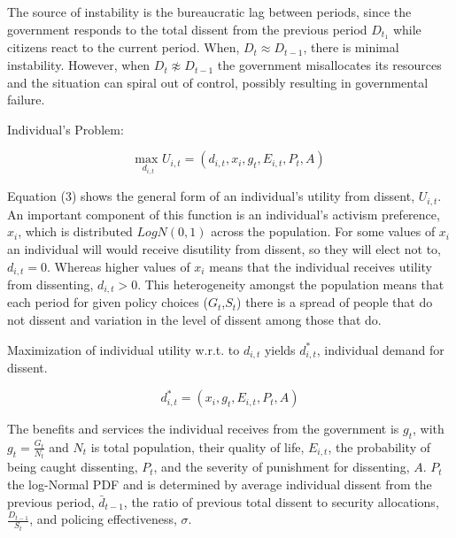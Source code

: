 \documentclass[12pt]{article}
\begin{document}
\begin{spacing}{1.5}
The source of instability is the bureaucratic lag between periods, since the government responds to the total dissent from the previous period $D_{t_1}$ while citizens react to the current period. When, $D_t \approx D_{t-1}$, there is minimal instability. However, when $D_t \not\approx D_{t-1}$ the government misallocates its resources and the situation can spiral out of control, possibly resulting in governmental failure. 

\vspace{.5 em}
\noindent Individual's Problem:

\begin{equation}
{\underset{d_{i,t}}{\text{max }}}  U_{i,t}= (d_{i,t},x_i,g_t, E_{i,t},P_t, A)
\end{equation}


Equation (3) shows the general form of an individual's utility from dissent, $U_{i,t}$. An important component of this function is an individual's activism preference, $x_i$, which is distributed $LogN(0,1)$ across the population. For some values of $x_i$ an individual will would receive disutility from dissent, so they will elect not to, $d_{i,t}=0$. Whereas higher values of $x_i$ means that the individual receives utility from dissenting, $d_{i,t}>0$. This heterogeneity amongst the population means that each period for given policy choices ($G_t$,$S_t$) there is a spread of people that do not dissent and variation in the level of dissent among those that do.  

Maximization of individual utility w.r.t. to $d_{i,t}$ yields $d_{i,t}^*$, individual demand for dissent.  

\vspace{.5 em}

\begin{equation}
d_{i,t}^*=(x_i,g_t,E_{i,t},P_t,A)
\end{equation}

The benefits and services the individual receives from the government is $g_t$, with $g_t=\frac{G_t}{N_t}$ and $N_t$ is total population, their quality of life, $E_{i,t}$, the probability of being caught dissenting, $P_t$, and the severity of punishment for dissenting, $A$. $P_t$ the log-Normal PDF and is determined by average individual dissent from the previous period, $\bar{d}_{t-1}$, the ratio of previous total dissent to security allocations, $\frac{D_{t-1}}{S_t}$, and policing effectiveness, $\sigma$. 



\end{spacing}
\end{document}
